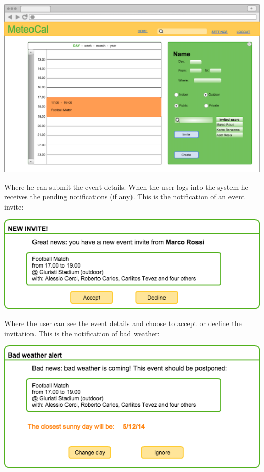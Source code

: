 \documentclass[10pt,a4paper,titlepage]{article}
\begin{document}
\vspace{3mm}\includegraphics[width={\linewidth}]{./UI_mockups/05-create_event.png}\vspace{3mm}

Where he can submit the event details.
When the user logs into the system he receives the pending notifications (if any). This is the notification of an event invite:

\vspace{3mm}\includegraphics[width={\linewidth}]{./UI_mockups/06-invite_received.png}\vspace{3mm}

Where the user can see the event details and choose to accept or decline the invitation.
This is the notification of bad weather:

\vspace{3mm}\includegraphics[width={\linewidth}]{./UI_mockups/07-bad_weather_three_days.png}\vspace{3mm}
\end{document}
